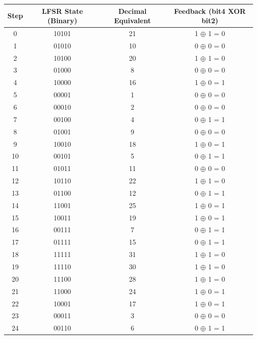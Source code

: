\documentclass[10pt,a4paper,twocolumn,twoside]{tau-class/tau}
\begin{document}
    \begin{table}[!t]
    \centering
        \begin{tabular}{|c|c|c|c|}
            \hline
            \textbf{Step} & \textbf{LFSR State (Binary)} & \textbf{Decimal Equivalent} & \textbf{Feedback (bit4 XOR bit2)} \\
            \hline
            0  & 10101 & 21 & 1 $\oplus$ 1 = 0 \\
            1  & 01010 & 10 & 0 $\oplus$ 0 = 0 \\
            2  & 10100 & 20 & 1 $\oplus$ 1 = 0 \\
            3  & 01000 & 8  & 0 $\oplus$ 0 = 0 \\
            4  & 10000 & 16 & 1 $\oplus$ 0 = 1 \\
            5  & 00001 & 1  & 0 $\oplus$ 0 = 0 \\
            6  & 00010 & 2  & 0 $\oplus$ 0 = 0 \\
            7  & 00100 & 4  & 0 $\oplus$ 1 = 1 \\
            8  & 01001 & 9  & 0 $\oplus$ 0 = 0 \\
            9  & 10010 & 18 & 1 $\oplus$ 0 = 1 \\
            10 & 00101 & 5  & 0 $\oplus$ 1 = 1 \\
            11 & 01011 & 11 & 0 $\oplus$ 0 = 0 \\
            12 & 10110 & 22 & 1 $\oplus$ 1 = 0 \\
            13 & 01100 & 12 & 0 $\oplus$ 1 = 1 \\
            14 & 11001 & 25 & 1 $\oplus$ 0 = 1 \\
            15 & 10011 & 19 & 1 $\oplus$ 0 = 1 \\
            16 & 00111 & 7  & 0 $\oplus$ 1 = 1 \\
            17 & 01111 & 15 & 0 $\oplus$ 1 = 1 \\
            18 & 11111 & 31 & 1 $\oplus$ 1 = 0 \\
            19 & 11110 & 30 & 1 $\oplus$ 1 = 0 \\
            20 & 11100 & 28 & 1 $\oplus$ 1 = 0 \\
            21 & 11000 & 24 & 1 $\oplus$ 0 = 1 \\
            22 & 10001 & 17 & 1 $\oplus$ 0 = 1 \\
            23 & 00011 & 3  & 0 $\oplus$ 0 = 0 \\
            24 & 00110 & 6  & 0 $\oplus$ 1 = 1 \\

\end{tabular}
\end{table}
\end{document}
